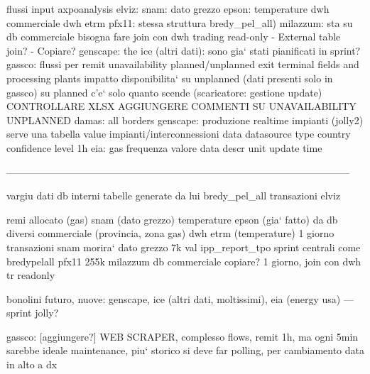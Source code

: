 flussi input axpoanalysis
    elviz:
    snam:
        dato grezzo
    epson:
        temperature
            dwh commerciale
        dwh etrm
    pfx11:
        stessa struttura bredy\_pel\_all)
    milazzum:
        sta su db commerciale
        bisogna fare join con dwh trading
        read-only
            - External table join?
            - Copiare?
    genscape:
    the ice (altri dati):
        sono gia` stati pianificati in sprint?
    gassco:
        flussi per remit
        unavailability planned/unplanned
            exit terminal
            fields and processing plants
        impatto disponibilita` su unplanned (dati presenti solo in gassco)
            su planned c'e` solo quanto scende
            (scaricatore: gestione update)
            CONTROLLARE XLSX
        AGGIUNGERE COMMENTI SU UNAVAILABILITY UNPLANNED
    damas:
        all borders
    genscape: produzione realtime impianti (jolly2)
        serve una tabella
            value
            impianti/interconnessioni
            data
            datasource
            type
            country
            confidence level
        1h
    eia:
        gas
            frequenza
            valore
            data
            descr
            unit
            update time

    
--------------------------------------------------------------------------------------------------------


vargiu 
    dati db interni
        tabelle generate da lui
        bredy\_pel\_all
            transazioni elviz
            
        remi allocato (gas)
            snam (dato grezzo)
        temperature epson (gia` fatto)
            da db diversi
                commerciale (provincia, zona gas)
                dwh etrm (temperature)
                1 giorno
        transazioni snam
            morira`
            dato grezzo
            7k val
        ipp\_report\_tpo
            sprint centrali
            come bredypelall
            pfx11
            255k
        milazzum
            db commerciale
            copiare?
            1 giorno, join con dwh tr
            readonly




bonolini
    futuro, nuove: genscape, ice (altri dati, moltissimi), eia (energy usa) --- sprint jolly?
    
    gassco:  [aggiungere?] WEB SCRAPER, complesso
        flows, remit
        1h, ma ogni 5min sarebbe ideale
        maintenance, piu` storico
        si deve far polling, per cambiamento data in alto a dx
        
